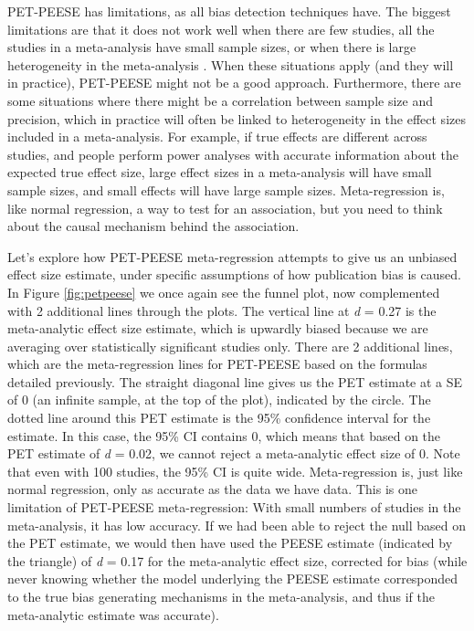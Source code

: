 \documentclass[
  oneside]{krantz}
\begin{document}
PET-PEESE has limitations, as all bias detection techniques have. The biggest limitations are that it does not work well when there are few studies, all the studies in a meta-analysis have small sample sizes, or when there is large heterogeneity in the meta-analysis \citep{stanley_finding_2017}. When these situations apply (and they will in practice), PET-PEESE might not be a good approach. Furthermore, there are some situations where there might be a correlation between sample size and precision, which in practice will often be linked to heterogeneity in the effect sizes included in a meta-analysis. For example, if true effects are different across studies, and people perform power analyses with accurate information about the expected true effect size, large effect sizes in a meta-analysis will have small sample sizes, and small effects will have large sample sizes. Meta-regression is, like normal regression, a way to test for an association, but you need to think about the causal mechanism behind the association.

Let's explore how PET-PEESE meta-regression attempts to give us an unbiased effect size estimate, under specific assumptions of how publication bias is caused. In Figure \ref{fig:petpeese} we once again see the funnel plot, now complemented with 2 additional lines through the plots. The vertical line at \emph{d} = 0.27 is the meta-analytic effect size estimate, which is upwardly biased because we are averaging over statistically significant studies only. There are 2 additional lines, which are the meta-regression lines for PET-PEESE based on the formulas detailed previously. The straight diagonal line gives us the PET estimate at a SE of 0 (an infinite sample, at the top of the plot), indicated by the circle. The dotted line around this PET estimate is the 95\% confidence interval for the estimate. In this case, the 95\% CI contains 0, which means that based on the PET estimate of \emph{d} = 0.02, we cannot reject a meta-analytic effect size of 0. Note that even with 100 studies, the 95\% CI is quite wide. Meta-regression is, just like normal regression, only as accurate as the data we have data. This is one limitation of PET-PEESE meta-regression: With small numbers of studies in the meta-analysis, it has low accuracy. If we had been able to reject the null based on the PET estimate, we would then have used the PEESE estimate (indicated by the triangle) of \emph{d} = 0.17 for the meta-analytic effect size, corrected for bias (while never knowing whether the model underlying the PEESE estimate corresponded to the true bias generating mechanisms in the meta-analysis, and thus if the meta-analytic estimate was accurate).
\end{document}
